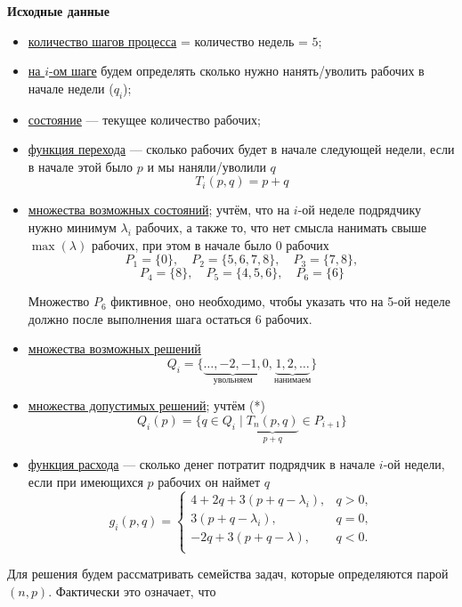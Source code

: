 \textbf{Исходные данные}
\begin{itemize}[nosep]
	\item \underline{количество шагов процесса} = количество недель = $5$;
	
	\item \underline{на $i$-ом шаге} будем определять сколько нужно нанять/уволить рабочих в начале недели ($q_i$);
	
	\item \underline{состояние} --- текущее количество рабочих;
	
	\item \underline{функция перехода} --- сколько рабочих будет в начале следующей недели, если в начале этой было $p$ и мы наняли/уволили $q$
	\[T_i(p, q) = p + q\]
	
	\item \underline{множества возможных состояний}; учтём, что на $i$-ой неделе подрядчику нужно минимум $\lambda_i$ рабочих, а также то, что нет смысла нанимать свыше $\max (\lambda)$ рабочих, при этом в начале было 0 рабочих
	\[
	P_1 = \{0\}, \quad P_2 = \{5, 6, 7, 8\}, \quad P_3 = \{7, 8\},
	\]
	\[
	P_4 = \{8\}, \quad P_5 = \{4, 5, 6\}, \quad P_6 = \{6\}
	\]
	
	Множество $P_6$ фиктивное, оно необходимо, чтобы указать что на 5-ой неделе должно после выполнения шага остаться 6 рабочих.
	
	\item \underline{множества возможных решений}
	\[
	Q_i = \{\underbrace{\dots, -2, -1,}_{\text{увольняем}} 0, \underbrace{1, 2, \dots}_{\text{нанимаем}}\}
	\]
	
	\item \underline{множества допустимых решений}; учтём (*)
	\[Q_i(p) = \{q \in Q_i \; \big| \; \underbrace{T_n(p, q)}_{p + q} \in P_{i + 1} \}\]
	
	\item \underline{функция расхода} --- сколько денег потратит подрядчик в начале $i$-ой недели, если при имеющихся $p$ рабочих он наймет $q$
	\[g_i(p,q) = \begin{cases}
		4 + 2q + 3(p + q - \lambda_i),& q > 0, \\
		3(p + q - \lambda_i),& q = 0, \\
		-2q + 3(p + q - \lambda),& q < 0. \\
	\end{cases}\]
\end{itemize}

Для решения будем рассматривать семейства задач, которые определяются парой $(n, p)$. Фактически это означает, что

